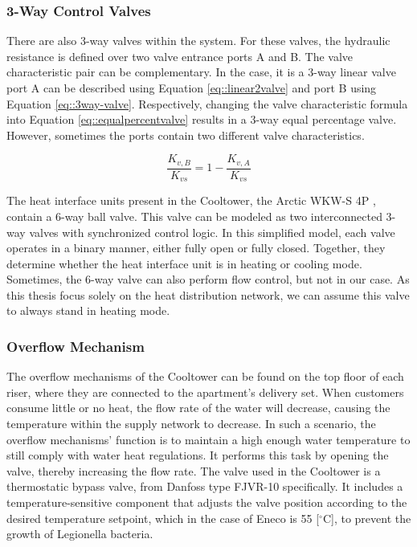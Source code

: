 \subsubsection{3-Way Control Valves}
There are also 3-way valves within the system. For these valves, the hydraulic resistance is defined over two valve entrance ports A and B.
The valve characteristic pair can be complementary. In the case, it is a 3-way linear valve port A can be described using Equation \ref{eq::linear2valve} and port B using Equation \ref{eq::3way-valve}. Respectively, changing the valve characteristic formula into Equation \ref{eq::equalpercentvalve} results in a 3-way equal percentage valve. However, sometimes the ports contain two different valve characteristics. 

\begin{equation}\label{eq::3way-valve}
    \frac{K_{v,B}}{K_{vs}} = 1 - \frac{K_{v,A}}{K_{vs}}
\end{equation}

The heat interface units present in the Cooltower, the Arctic WKW-S 4P \cite{fortes_wkw_s_4p}, contain a 6-way ball valve. This valve can be modeled as two interconnected 3-way valves with synchronized control logic. In this simplified model, each valve operates in a binary manner, either fully open or fully closed. Together, they determine whether the heat interface unit is in heating or cooling mode. Sometimes, the 6-way valve can also perform flow control, but not in our case. As this thesis focus solely on the heat distribution network, we can assume this valve to always stand in heating mode.


\subsubsection{Overflow Mechanism}
The overflow mechanisms of the Cooltower can be found on the top floor of each riser, where they are connected to the apartment's delivery set. When customers consume little or no heat, the flow rate of the water will decrease, causing the temperature within the supply network to decrease. In such a scenario, the overflow mechanisms' function is to maintain a high enough water temperature to still comply with water heat regulations. It performs this task by opening the valve, thereby increasing the flow rate. The valve used in the Cooltower is a thermostatic bypass valve, from Danfoss type FJVR-10 specifically. It includes a temperature-sensitive component that adjusts the valve position according to the desired temperature setpoint, which in the case of Eneco is 55 [$^{\circ}\text{C}$], to prevent the growth of Legionella bacteria. 



